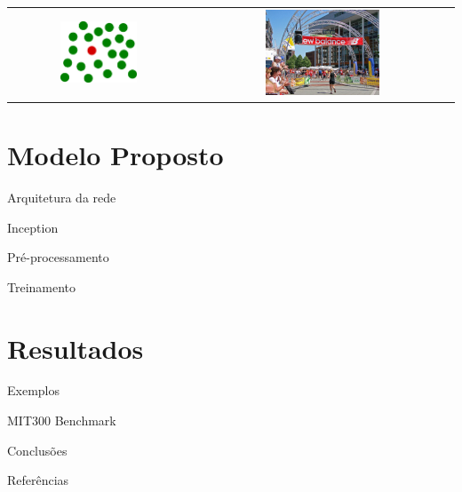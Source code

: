 \documentclass[10pt]{beamer}
\begin{document}
\begin{frame}{}
    \begin{center}
        \begin{tabular} {cc}
        \includegraphics[width=0.45\textwidth]{./img/red_in_green.png} &
        \includegraphics[width=0.45\textwidth]{./img/running_people.jpg}
        \end{tabular}
    \end{center}
\end{frame}

\section{Modelo Proposto}

\begin{frame}{Arquitetura da rede}
\end{frame}

\begin{frame}{Inception}
\end{frame}

\begin{frame}{Pré-processamento}
\end{frame}

\begin{frame}{Treinamento}
\end{frame}

\section{Resultados}

\begin{frame}{Exemplos}
\end{frame}

\begin{frame}{MIT300 Benchmark}
\end{frame}

\begin{frame}{Conclusões}
\end{frame}

\begin{frame}{Referências}
\end{frame}
\end{document}
